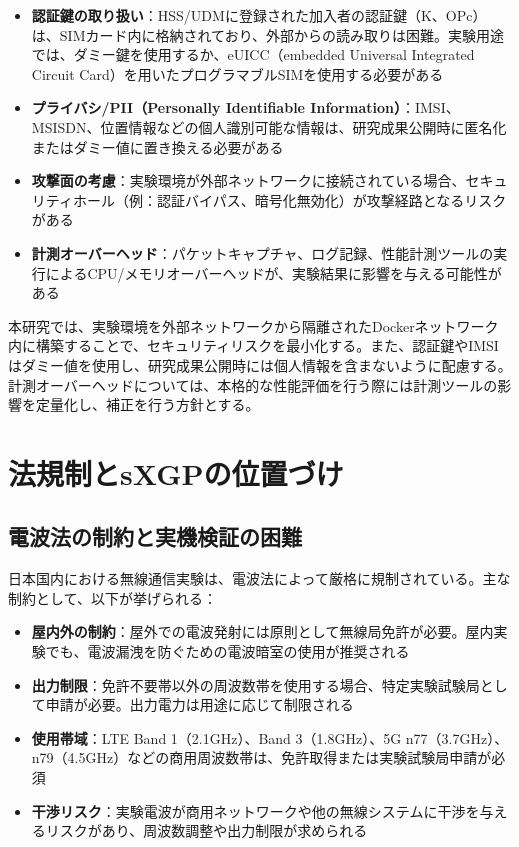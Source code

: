 \begin{itemize}
\item \textbf{認証鍵の取り扱い}：HSS/UDMに登録された加入者の認証鍵（K、OPc）は、SIMカード内に格納されており、外部からの読み取りは困難。実験用途では、ダミー鍵を使用するか、eUICC（embedded Universal Integrated Circuit Card）を用いたプログラマブルSIMを使用する必要がある
\item \textbf{プライバシ/PII（Personally Identifiable Information）}：IMSI、MSISDN、位置情報などの個人識別可能な情報は、研究成果公開時に匿名化またはダミー値に置き換える必要がある
\item \textbf{攻撃面の考慮}：実験環境が外部ネットワークに接続されている場合、セキュリティホール（例：認証バイパス、暗号化無効化）が攻撃経路となるリスクがある
\item \textbf{計測オーバーヘッド}：パケットキャプチャ、ログ記録、性能計測ツールの実行によるCPU/メモリオーバーヘッドが、実験結果に影響を与える可能性がある
\end{itemize}

本研究では、実験環境を外部ネットワークから隔離されたDockerネットワーク内に構築することで、セキュリティリスクを最小化する。また、認証鍵やIMSIはダミー値を使用し、研究成果公開時には個人情報を含まないように配慮する。計測オーバーヘッドについては、本格的な性能評価を行う際には計測ツールの影響を定量化し、補正を行う方針とする。

\section{法規制とsXGPの位置づけ}

\subsection{電波法の制約と実機検証の困難}

日本国内における無線通信実験は、電波法によって厳格に規制されている。主な制約として、以下が挙げられる：

\begin{itemize}
\item \textbf{屋内外の制約}：屋外での電波発射には原則として無線局免許が必要。屋内実験でも、電波漏洩を防ぐための電波暗室の使用が推奨される
\item \textbf{出力制限}：免許不要帯以外の周波数帯を使用する場合、特定実験試験局として申請が必要。出力電力は用途に応じて制限される
\item \textbf{使用帯域}：LTE Band 1（2.1GHz）、Band 3（1.8GHz）、5G n77（3.7GHz）、n79（4.5GHz）などの商用周波数帯は、免許取得または実験試験局申請が必須
\item \textbf{干渉リスク}：実験電波が商用ネットワークや他の無線システムに干渉を与えるリスクがあり、周波数調整や出力制限が求められる
\end{itemize}


